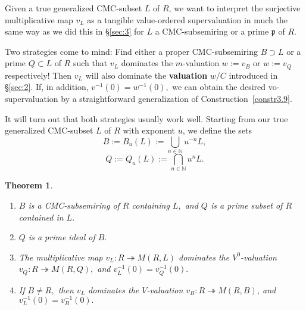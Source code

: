 \documentclass [12pt,a4paper,reqno]{amsart}
\newtheorem{thm}{Theorem} [section]
\begin{document}
Given a true generalized CMC-subset $L$ of $R$, we want to
interpret the surjective multiplicative  map $v_L$ as a tangible
value-ordered supervaluation in much the same way as we did this
in \S\ref{sec:3} for $L$ a CMC-subsemiring or a prime ${\mathfrak p}$ of
$R.$

Two strategies come to mind:
      Find either a
proper CMC-subsemiring $B\supset L$ or   a prime $Q\subset L$ of
$R$ such that $v_L$ dominates the $m$-valuation $w:=v_B$  or $w:=
v_Q$ respectively!
  Then $v_L$ will also dominate the
{\textbf{{valuation}}} $w/C$ introduced in \S\ref{sec:2}.
 If, in addition, $v^{-1}(0)=w^{-1}(0),$ we can obtain the desired vo-supervaluation
by a straightforward generalization of
Construction~\ref{constr3.9}.

It will turn out that both strategies usually work well. Starting
from our true generalized CMC-subset $L$ of $R$ with exponent $u$,
we define the sets
$$B:=B_u(L):=\bigcup_{n\in\mathbb N}u^{-n}L,$$
$$Q:=Q_u(L):=\bigcap_{n\in\mathbb N}u^{n}L.$$

\begin{thm}\label{thm4.15}
{}\quad

\begin{enumerate}\item[i)] $B$ is a CMC-subsemiring of $R$
containing $L,$ and $Q$ is a prime subset of $R$ contained in $L.$

\item[ii)] $Q$ is a prime ideal of $B.$ \item[iii)] The
multiplicative map $v_L:R\twoheadrightarrow M(R,L)$ dominates the
$V^0$-valuation $v_Q: R\twoheadrightarrow M(R,Q),$ and
$v_L^{-1}(0)=v_Q^{-1}(0).$

\item[iv)] If $B\ne R,$ then $v_L$ dominates the $V$-valuation
$v_B: R\twoheadrightarrow M(R,B)$, and
$v_L^{-1}(0)=v_B^{-1}(0).$\end{enumerate}\end{thm}
\end{document}
